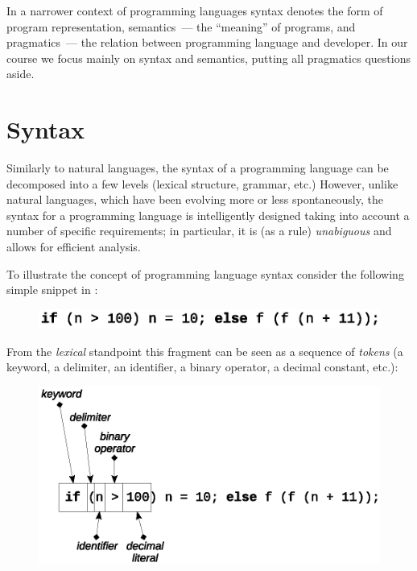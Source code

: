 In a narrower context of programming languages syntax denotes the form of program representation, semantics~--- the ``meaning'' of programs, and pragmatics~---
the relation between programming language and developer. In our course we focus mainly on syntax and semantics, putting all pragmatics questions aside.

\section{Syntax}

Similarly to natural languages, the syntax of a programming language can be decomposed into a few levels (lexical structure, grammar, etc.) However,
unlike natural languages, which have been evolving more or less spontaneously, the syntax for a programming language is intelligently designed taking
into account a number of specific requirements; in particular, it is (as a rule) \emph{unabiguous} and allows for efficient analysis.

To illustrate the concept of programming language syntax consider the following simple snippet in :

\begin{figure}[h]
  \centering
  \includegraphics[scale=0.7]{images/01-01.eps}
\end{figure}

From the \emph{lexical} standpoint this fragment can be seen as a sequence of \emph{tokens} (a keyword, a delimiter, an identifier, a binary operator,
a decimal constant, etc.):

\begin{figure}[h]
  \centering
  \includegraphics[scale=0.7]{images/01-02.eps}
\end{figure}

